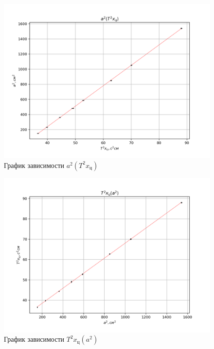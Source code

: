 \documentclass[a4paper, 12pt]{article}
\begin{document}
    \newpage
    \begin{figure}
        \includegraphics[scale=1.2]{plot2.png}
        \caption{График зависимости $a^2(T^2x_ц)$}
    \end{figure}

    \newpage
    \begin{figure}
        \includegraphics[scale=1.2]{plot3.png}
        \caption{График зависимости $T^2x_ц(a^2)$}
    \end{figure}
\end{document}

